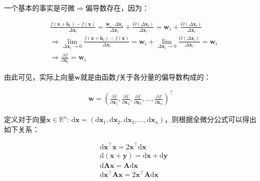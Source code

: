 \documentclass[UTF8]{book}
\begin{document}
一个基本的事实是可微$\Rightarrow$偏导数存在，因为：
\begin{large}
    \begin{equation}
        \begin{aligned}
            &\frac{f(\mathbf{x}+\mathbf{h}_i)-f(\mathbf{x})}{\Delta\mathbf{x}_i} = \frac{\mathbf{w}_i \cdot \Delta\mathbf{x}_i}{\Delta\mathbf{x}_i}+\frac{O(\Delta\mathbf{x}_i)}{\Delta\mathbf{x}_i}= \mathbf{w}_i+\frac{O(\Delta\mathbf{x}_i)}{\Delta\mathbf{x}_i} \\
            &\Rightarrow \lim_{\Delta\mathbf{x}_{i}\to 0} \frac{f(\mathbf{x}+\mathbf{h}_{i})-f(\mathbf{x})}{\Delta\mathbf{x}_i}=\mathbf{w}_i+\lim_{\Delta\mathbf{x}_{i}\to 0}\frac{O(\Delta\mathbf{x}_i)}{\Delta\mathbf{x}_i}=\mathbf{w}_i \\
            &\Rightarrow \frac{\partial f}{\partial \mathbf{x}_i}=\mathbf{w}_i 
            \nonumber
        \end{aligned}
    \end{equation}
\end{large}
由此可见，实际上向量$\mathbf{w}$就是由函数$f$关于各分量的偏导数构成的：
\begin{large}
    \begin{equation}
        \begin{aligned}
            \mathbf{w}=\left ( \frac{\partial f}{\partial \mathbf{x}_1},\frac{\partial f}{\partial \mathbf{x}_2},\frac{\partial f}{\partial \mathbf{x}_3},\dots,\frac{\partial f}{\partial \mathbf{x}_n} \right )^\top
            \nonumber
        \end{aligned}
    \end{equation}
\end{large}
定义对于向量$\mathbf{x}\in\mathbb{R}^n$: $\mathrm{d}\mathbf{x}=(\mathrm{d}\mathbf{x}_1,\mathrm{d}\mathbf{x}_2,\mathrm{d}\mathbf{x}_3,\dots,\mathrm{d}\mathbf{x}_n)$，则根据全微分公式可以得出如下关系：
\begin{large}
    \begin{equation}
        \begin{aligned}
            &\mathrm{d}\mathbf{x}^\top\mathbf{x}=2\mathbf{x}^\top\mathrm{d}\mathbf{x} \\
            &\mathrm{d}(\mathbf{x}+\mathbf{y})=\mathrm{d}\mathbf{x}+\mathrm{d}\mathbf{y} \\
            &\mathrm{d}{\mathbf{A}\mathbf{x}}=\mathbf{A}\mathrm{d}\mathbf{x} \\
            &\mathrm{d}{\mathbf{x}^\top \mathbf{A} \mathbf{x}}=2\mathbf{x}^\top \mathbf{A} \mathrm{d}\mathbf{x}
            \nonumber
        \end{aligned}
    \end{equation}
\end{large}
\end{document}
